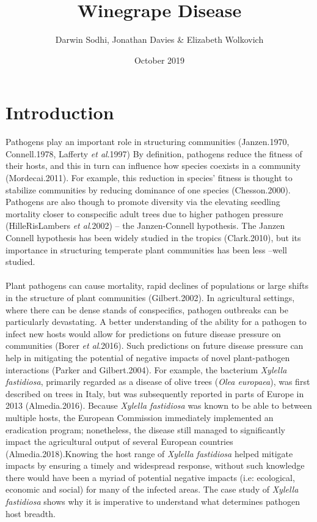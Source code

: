 \documentclass[11pt,letter]{article}
\begin{document}
\title{Winegrape Disease}
\author{Darwin Sodhi, Jonathan Davies & Elizabeth Wolkovich }
\date{October 2019}


\maketitle

\section{Introduction}
Pathogens play an important role in structuring communities (Janzen.1970, Connell.1978, Lafferty \textit{et al}.1997) By definition, pathogens reduce the fitness of their hosts, and this in turn can influence how species coexists in a community (Mordecai.2011). For example, this reduction in species’ fitness is thought to stabilize communities by reducing dominance of one species (Chesson.2000). Pathogens are also though to promote diversity via the elevating seedling mortality closer to conspecific adult trees due to higher pathogen pressure (HilleRisLambers \textit{et al}.2002) – the Janzen-Connell hypothesis. The Janzen Connell hypothesis has been widely studied in the tropics (Clark.2010), but its importance in structuring temperate plant communities has been less –well studied. 
\paragraph{}Plant pathogens can cause mortality, rapid declines of populations or large shifts in the structure of plant communities (Gilbert.2002). In agricultural settings, where there can be dense stands of conspecifics, pathogen outbreaks can be particularly devastating. A better understanding of the ability for a pathogen to infect new hosts would allow for predictions on future disease pressure on communities (Borer \textit{et al}.2016). Such predictions on future disease pressure can help in mitigating the potential of negative impacts of novel plant-pathogen interactions (Parker and Gilbert.2004). For example, the bacterium \textit{Xylella fastidiosa}, primarily regarded as a disease of olive trees (\textit{Olea europaea}), was first described on trees in Italy, but was subsequently reported in parts of Europe in 2013 (Almedia.2016). Because \textit{Xylella fastidiosa} was known to be able to between multiple hosts, the European Commission immediately implemented an eradication program; nonetheless, the disease still managed to significantly impact the agricultural output of several European countries (Almedia.2018).Knowing the host range of \textit{Xylella fastidiosa} helped mitigate impacts by ensuring a timely and widespread response, without such knowledge there would have been a myriad of potential negative impacts (i.e: ecological, economic and social) for many of the infected areas.  The case study of \textit{Xylella fastidiosa} shows why it is imperative to understand what determines pathogen host breadth.
\end{document}

